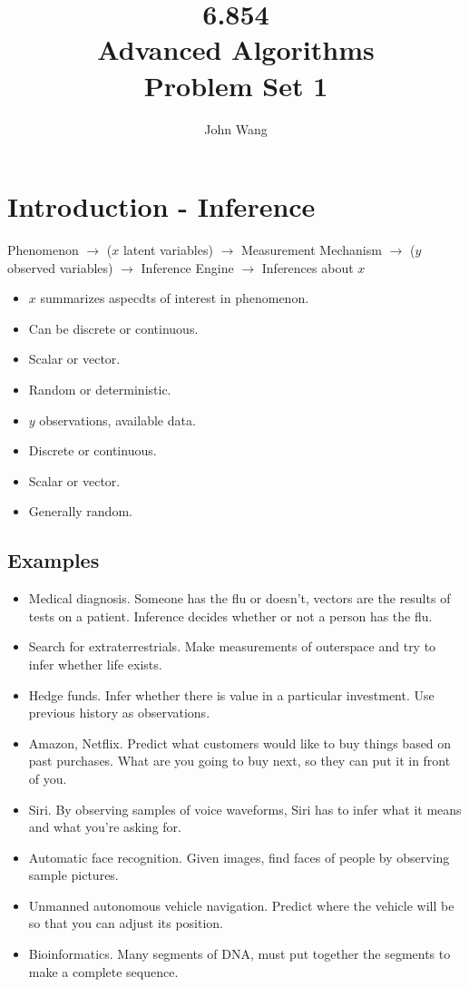 \documentclass[psamsfonts]{amsart}
\title{6.854 \\
Advanced Algorithms \\
Problem Set 1}
\author{John Wang}
\begin{document}
\maketitle

\section{Introduction - Inference}

Phenomenon $\rightarrow$ ($x$ latent variables) $\rightarrow$ Measurement Mechanism $\rightarrow$ ($y$ observed variables) $\rightarrow$ Inference Engine $\rightarrow$ Inferences about $x$

\begin{itemize}
\item $x$ summarizes aspecdts of interest in phenomenon. 
\item Can be discrete or continuous. 
\item Scalar or vector. 
\item Random or deterministic.
\end{itemize}

\begin{itemize}
\item $y$ observations, available data.
\item Discrete or continuous.
\item Scalar or vector.
\item Generally random.
\end{itemize}

\subsection{Examples}

\begin{itemize}
\item Medical diagnosis. Someone has the flu or doesn't, vectors are the results of tests on a patient. Inference decides whether or not a person has the flu.
\item Search for extraterrestrials. Make measurements of outerspace and try to infer whether life exists.
\item Hedge funds. Infer whether there is value in a particular investment. Use previous history as observations.
\item Amazon, Netflix. Predict what customers would like to buy things based on past purchases. What are you going to buy next, so they can put it in front of you.
\item Siri. By observing samples of voice waveforms, Siri has to infer what it means and what you're asking for.
\item Automatic face recognition. Given images, find faces of people by observing sample pictures.
\item Unmanned autonomous vehicle navigation. Predict where the vehicle will be so that you can adjust its position.
\item Bioinformatics. Many segments of DNA, must put together the segments to make a complete sequence. 
\end{itemize}
\end{document}
